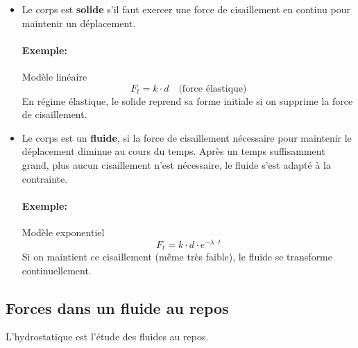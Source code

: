 \documentclass[
    11pt,
    a4paper,
    oneside,
    headinlcude, footinclude,
    twoside,
]{report}
\begin{document}
\begin{itemize}
    \item Le corps est \textbf{solide} s'il faut exercer une force de cisaillement en
        continu pour maintenir un déplacement.

        \paragraph{Exemple:}

        Modèle linéaire $$F_{t} = k \cdot d \quad \text{(force élastique)}$$
        En régime élastique, le solide reprend sa forme initiale si on supprime la
        force de cisaillement.

    \item Le corps est un \textbf{fluide}, si la force de cisaillement
        nécessaire pour maintenir le déplacement diminue au cours du temps.
        Après un temps suffisamment grand, plus aucun cisaillement n'est
        nécessaire, le fluide s'est adapté à la contrainte.

        \paragraph{Exemple:}
        
        Modèle exponentiel $$F_{t} = k \cdot d \cdot e^{-\lambda \cdot t}$$
        Si on maintient ce cisaillement (même très faible), le fluide se
        transforme continuellement.
\end{itemize}

\subsection{Forces dans un fluide au repos}

L'hydrostatique est l'étude des fluides au repos.
\end{document}
